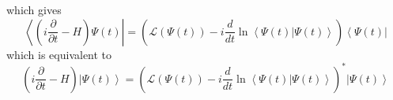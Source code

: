 \documentclass[aps,preprint]{revtex4}
\begin{document}
which gives 
\begin{equation}
\left\langle \left( i\frac{\partial }{\partial t}-H\right) \Psi \left(
t\right) \right\vert =\left( \mathcal{L}\left( \Psi \left( t\right) \right)
-i\frac{d}{dt}\ln \left\langle \Psi \left( t\right) |\Psi \left( t\right)
\right\rangle \right) \left\langle \Psi \left( t\right) \right\vert
\label{c1}
\end{equation}%
which is equivalent to 
\begin{equation}
\left( i\frac{\partial }{\partial t}-H\right) \left\vert \Psi \left(
t\right) \right\rangle =\left( \mathcal{L}\left( \Psi \left( t\right)
\right) -i\frac{d}{dt}\ln \left\langle \Psi \left( t\right) |\Psi \left(
t\right) \right\rangle \right) ^{\ast }\left\vert \Psi \left( t\right)
\right\rangle
\end{equation}
\end{document}
